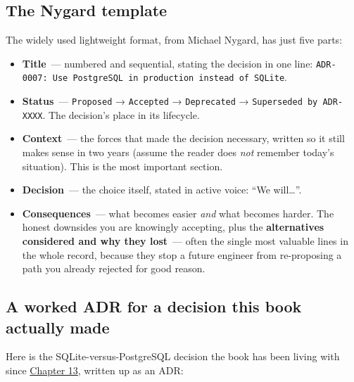 \subsection*{The Nygard template}\label{39-local-vs-production:the-nygard-template}

The widely used lightweight format, from Michael Nygard, has just five parts:

\begin{itemize}
\tightlist
\item
  \textbf{Title}~--- numbered and sequential, stating the decision in one line: \texttt{ADR-}\allowbreak{}\texttt{0007:}\allowbreak{}\texttt{\ Use\ PostgreSQL\ in\ production\ instead\ of\ SQLite}.
\item
  \textbf{Status}~--- \texttt{Proposed} → \texttt{Accepted} → \texttt{Deprecated} → \texttt{Superseded\ by\ ADR-XXXX}. The decision's place in its lifecycle.
\item
  \textbf{Context}~--- the forces that made the decision necessary, written so it still makes sense in two years (assume the reader does \emph{not} remember today's situation). This is the most important section.
\item
  \textbf{Decision}~--- the choice itself, stated in active voice: ``We will\ldots{}''.
\item
  \textbf{Consequences}~--- what becomes easier \emph{and} what becomes harder. The honest downsides you are knowingly accepting, plus the \textbf{alternatives considered and why they lost}~--- often the single most valuable lines in the whole record, because they stop a future engineer from re-proposing a path you already rejected for good reason.
\end{itemize}

\subsection*{A worked ADR for a decision this book actually made}\label{39-local-vs-production:a-worked-adr-for-a-decision-this-book-actually-made}

Here is the SQLite-versus-PostgreSQL decision the book has been living with since \hyperref[ch:13-configuration-externalization]{Chapter 13}, written up as an ADR:


